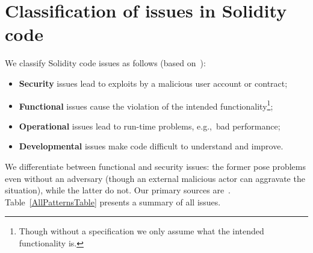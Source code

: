 \section {Classification of issues in Solidity code}

We classify Solidity code issues as follows (based on~\cite{Henney2003}):
\begin{itemize}
	\item \textbf{Security} issues lead to exploits by a malicious user account or contract;
	\item \textbf{Functional} issues cause the violation of the intended functionality\footnote{Though without a specification we only assume what the intended functionality is.};
	\item \textbf{Operational} issues lead to run-time problems, e.g.,~bad performance;
	\item \textbf{Developmental} issues make code difficult to understand and improve.
\end{itemize}
We differentiate between functional and security issues: the former pose problems even without an adversary (though an external malicious actor can aggravate the situation), while the latter do not. Our primary sources are~\cite{Consensys2016, Solidity2017, Atzei2017, Delmolino2016, Chen2017, OpenZeppelin2017a}.
Table~\ref{AllPatternsTable} presents a summary of all issues.


